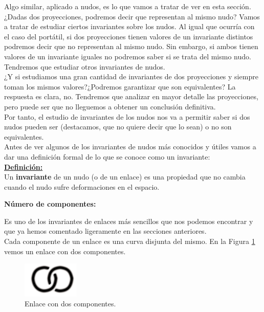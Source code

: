 \documentclass[14pt]{extarticle}
\begin{document}
Algo similar, aplicado a nudos, es lo que vamos a tratar de ver en esta sección. ¿Dadas dos proyecciones, podremos decir que representan al mismo nudo? Vamos a tratar de estudiar ciertos invariantes sobre los nudos. Al igual que ocurría con el caso del portátil, si dos proyecciones tienen valores de un invariante distintos podremos decir que no representan al mismo nudo. Sin embargo, si ambos tienen valores de un invariante iguales no podremos saber si se trata del mismo nudo. Tendremos que estudiar otros invariantes de nudos. \\

¿Y si estudiamos una gran cantidad de invariantes de dos proyecciones y siempre toman los mismos valores?¿Podremos garantizar que son equivalentes? La respuesta es clara, no. Tendremos que analizar en mayor detalle las proyecciones, pero puede ser que no lleguemos a obtener un conclusión definitiva. \\

    
Por tanto, el estudio de invariantes de los nudos nos va a permitir saber si dos nudos pueden ser (destacamos, que no quiere decir que lo sean) o no son equivalentes.\\


Antes de ver algunos de los invariantes de nudos más conocidos y útiles vamos a dar una definición formal de lo que se conoce como un invariante:\\

\underline{\textbf{Definición:}} \\
Un \textbf{invariante} de un nudo (o de un enlace) es una propiedad que no cambia cuando el nudo sufre deformaciones en el espacio. \\



\begin{center}
	\textbf{Número de componentes:}
\end{center}
Es uno de los invariantes de enlaces más sencillos que nos podemos encontrar y que ya hemos comentado ligeramente en las secciones anteriores.\\

Cada componente de un enlace es una curva disjunta del mismo. En la Figura \ref{inv1} vemos un enlace con dos componentes. 
  \begin{figure}[h!]
  	\includegraphics[width=2.7cm]{enlace.png}
  	\centering
  	\caption{Enlace con dos componentes.}
  	\label{inv1} 
  \end{figure}
  
\end{document}
